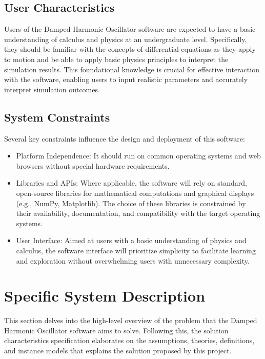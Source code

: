 \documentclass[12pt]{article}
\begin{document}
\subsection{User Characteristics} \label{SecUserCharacteristics}

Users of the Damped Harmonic Oscillator software are expected to have a basic 
understanding of calculus and physics at an undergraduate level. Specifically, 
they should be familiar with the concepts of differential equations as they 
apply to motion and be able to apply basic physics principles to interpret 
the simulation results. This foundational knowledge is crucial for effective 
interaction with the software, enabling users to input realistic parameters 
and accurately interpret simulation outcomes.

\subsection{System Constraints}

Several key constraints influence the design and deployment of this software:

\begin{itemize}
  \item Platform Independence: It should run on common operating systems and 
  web browsers without special hardware requirements.
  \item Libraries and APIs: Where applicable, the software will rely on standard, 
  open-source libraries for mathematical computations and graphical displays 
  (e.g., NumPy, Matplotlib). The choice of these libraries is constrained by 
  their availability, documentation, and compatibility with the target operating 
  systems.
  \item User Interface: Aimed at users with a basic understanding of physics and 
  calculus, the software interface will prioritize simplicity to facilitate 
  learning and exploration without overwhelming users with unnecessary complexity.
\end{itemize}

\section{Specific System Description}

This section delves into the high-level overview of the problem that the Damped 
Harmonic Oscillator software aims to solve. Following this, the solution 
characteristics specification elaborates on the assumptions, theories, definitions, 
and instance models that explains the solution proposed by this project.
\end{document}
